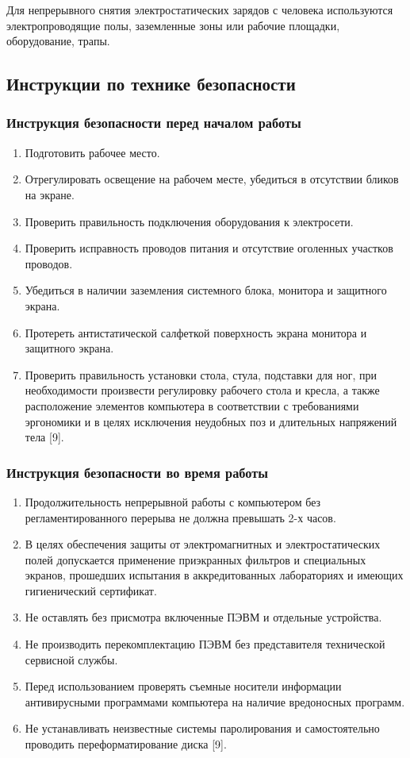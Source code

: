 Для непрерывного снятия электростатических зарядов с человека используются электропроводящие полы, заземленные зоны или рабочие площадки, оборудование, трапы.

\subsection{Инструкции по технике безопасности}

\subsubsection{Инструкция безопасности перед началом работы}

\begin{enumerate}
 \item Подготовить рабочее место.
 \item Отрегулировать освещение на рабочем месте, убедиться в отсутствии бликов на экране.
 \item Проверить правильность подключения оборудования к электросети.
 \item Проверить исправность проводов питания и отсутствие оголенных участков проводов.
 \item Убедиться в наличии заземления системного блока, монитора и защитного экрана.
 \item Протереть антистатической салфеткой поверхность экрана монитора и защитного экрана.
 \item Проверить правильность установки стола, стула, подставки для ног, при необходимости произвести регулировку рабочего стола и кресла, а также расположение элементов компьютера в соответствии с требованиями эргономики и в целях исключения неудобных поз и длительных напряжений тела [9].
\end{enumerate}

\subsubsection{Инструкция безопасности во время работы}

\begin{enumerate}
 \item Продолжительность непрерывной работы с компьютером без регламентированного перерыва не должна превышать 2-х часов.
 \item В целях обеспечения защиты от электромагнитных и электростатических полей допускается применение приэкранных фильтров и специальных экранов, прошедших испытания в аккредитованных лабораториях и имеющих гигиенический сертификат.
 \item Не оставлять без присмотра включенные ПЭВМ и отдельные устройства.
 \item Не производить перекомплектацию ПЭВМ без представителя технической сервисной службы.
 \item Перед использованием проверять съемные носители информации антивирусными программами компьютера на наличие вредоносных программ.
 \item Не устанавливать неизвестные системы паролирования и самостоятельно проводить переформатирование диска [9].
\end{enumerate}

